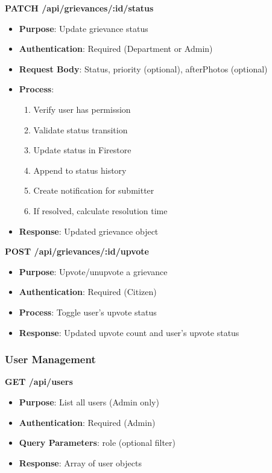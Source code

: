 \documentclass[12pt,a4paper]{article}
\begin{document}
\textbf{PATCH /api/grievances/:id/status}
\begin{itemize}
    \item \textbf{Purpose}: Update grievance status
    \item \textbf{Authentication}: Required (Department or Admin)
    \item \textbf{Request Body}: Status, priority (optional), afterPhotos (optional)
    \item \textbf{Process}:
    \begin{enumerate}
        \item Verify user has permission
        \item Validate status transition
        \item Update status in Firestore
        \item Append to status history
        \item Create notification for submitter
        \item If resolved, calculate resolution time
    \end{enumerate}
    \item \textbf{Response}: Updated grievance object
\end{itemize}

\textbf{POST /api/grievances/:id/upvote}
\begin{itemize}
    \item \textbf{Purpose}: Upvote/unupvote a grievance
    \item \textbf{Authentication}: Required (Citizen)
    \item \textbf{Process}: Toggle user's upvote status
    \item \textbf{Response}: Updated upvote count and user's upvote status
\end{itemize}

\subsubsection{User Management}

\textbf{GET /api/users}
\begin{itemize}
    \item \textbf{Purpose}: List all users (Admin only)
    \item \textbf{Authentication}: Required (Admin)
    \item \textbf{Query Parameters}: role (optional filter)
    \item \textbf{Response}: Array of user objects
\end{itemize}
\end{document}
